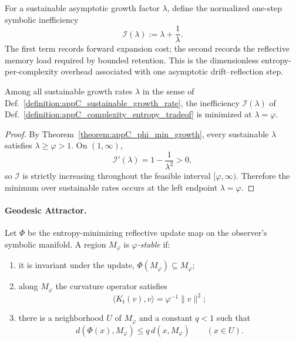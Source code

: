 \begin{definition}
\label{definition:appC_complexity_entropy_tradeof}
For a sustainable asymptotic growth factor $\lambda$, define the normalized
one-step symbolic inefficiency
\[
\mathcal{I}(\lambda):=\lambda+\frac{1}{\lambda}.
\]
The first term records forward expansion cost; the second records the reflective
memory load required by bounded retention. This is the dimensionless
entropy-per-complexity overhead associated with one asymptotic drift--reflection
step.
\end{definition}

\begin{theorem}
\label{theorem:appC_phi_minimized_entropy_per_complexity}
Among all sustainable growth rates $\lambda$ in the sense of
Def.~\ref{definition:appC_sustainable_growth_rate}, the inefficiency
$\mathcal{I}(\lambda)$ of Def.~\ref{definition:appC_complexity_entropy_tradeof} is
minimized at $\lambda=\varphi$.
\end{theorem}

\begin{proof}
\label{proof:appC_phi_minimized_entropy_per_complexity}
By Theorem~\ref{theorem:appC_phi_min_growth}, every sustainable $\lambda$ satisfies
$\lambda\ge\varphi>1$. On $(1,\infty)$,
\[
\mathcal{I}'(\lambda)=1-\frac{1}{\lambda^2}>0,
\]
so $\mathcal{I}$ is strictly increasing throughout the feasible interval
$[\varphi,\infty)$. Therefore the minimum over sustainable rates occurs at the
left endpoint $\lambda=\varphi$.
\end{proof}

\paragraph{Geodesic Attractor.}
\label{paragraph:geometric_attractor_and_phi_spiral}

\begin{definition}
\label{definition:appC_phi_stable_region}
Let $\Phi$ be the entropy-minimizing reflective update map on the observer's
symbolic manifold. A region $M_\varphi$ is \emph{$\varphi$-stable} if:
\begin{enumerate}
    \item it is invariant under the update, $\Phi(M_\varphi)\subseteq M_\varphi$;
    \item along $M_\varphi$ the curvature operator satisfies
    \[
    \langle K_t(v), v \rangle = \varphi^{-1} \|v\|^2;
    \]
    \item there is a neighborhood $U$ of $M_\varphi$ and a constant $q<1$ such that
    \[
    d(\Phi(x),M_\varphi)\le q\,d(x,M_\varphi)\qquad(x\in U).
    \]
\end{enumerate}
\end{definition}

